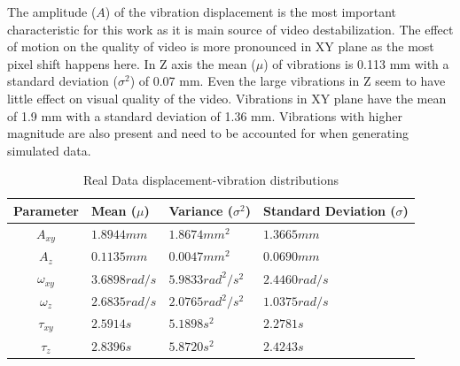 The amplitude ($ A $) of the vibration displacement is the most important characteristic for this work as it is main source of video destabilization. The effect of motion on the quality of video is more pronounced in XY plane as the most pixel shift happens here. In Z axis the mean ($ \mu $) of vibrations is 0.113 mm with a standard deviation ($ \sigma^{2} $) of 0.07 mm. Even the large vibrations in Z seem to have little effect on visual quality of the video. Vibrations in XY plane have the mean of 1.9 mm with a standard deviation of 1.36 mm. Vibrations with higher magnitude are also present and need to be accounted for when generating simulated data.




\begin{table}[ht]
    \centering
\begin{tabular}{ c | L | L | L }
    
     Parameter  & 
     Mean ($ \mu $) & 
     Variance ($ \sigma^{2} $) &
     Standard Deviation ($ \sigma $)\\
     \hline
     
     $ A_{xy} $ & 
     $ 1.8944 mm $ & 
     $ 1.8674 mm^{2} $ &
     $ 1.3665 mm $ \\

      
     $ A_{z} $  & 
     $ 0.1135 mm $ & 
     $ 0.0047 mm^{2} $ &
     $ 0.0690 mm $ \\
     
     
     $ \omega_{xy} $ & 
     $ 3.6898 rad/s $ & 
     $ 5.9833 rad^{2}/s^{2} $ &
     $ 2.4460 rad/s $ \\
     
     
     $ \omega_{z} $& 
     $ 2.6835 rad/s $ & 
     $ 2.0765 rad^{2}/s^{2} $ &
     $ 1.0375 rad/s $ \\

     
     $ \tau_{xy} $ & 
     $ 2.5914 s $ & 
     $ 5.1898 s^{2} $ &
     $ 2.2781 s $ \\


     $ \tau_{z} $ & 
     $ 2.8396 s $ & 
     $ 5.8720 s^{2} $ &
     $ 2.4243 s $ \\

\end{tabular}
    \caption{Real Data displacement-vibration distributions}
    \label{tab:real_data_analysis_displacement}
\end{table}


